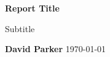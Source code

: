 \begin{titlepage}
    \begin{center}
        \Huge
        \textbf{Report Title}
            
        \vspace{0.5cm}
        \LARGE
        Subtitle
            
        \vspace{1.5cm}
            
        \textbf{David Parker}
        \today
            
    \end{center}
\end{titlepage}